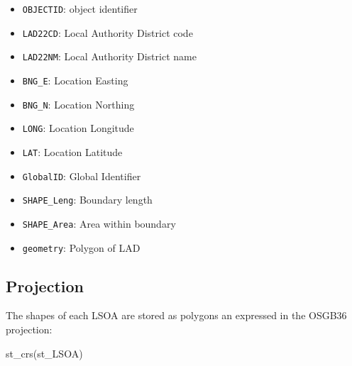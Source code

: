 \documentclass[
  letterpaper,
  DIV=11,
  numbers=noendperiod]{scrreprt}
\newenvironment{Shaded}{\begin{snugshade}}{\end{snugshade}}
\newcommand{\FunctionTok}[1]{\textcolor[rgb]{0.28,0.35,0.67}{#1}}
\newcommand{\NormalTok}[1]{\textcolor[rgb]{0.00,0.23,0.31}{#1}}
\providecommand{\tightlist}{%
  \setlength{\itemsep}{0pt}\setlength{\parskip}{0pt}}\usepackage{longtable,booktabs,array}
\begin{document}
\begin{itemize}
\tightlist
\item
  \texttt{OBJECTID}: object identifier
\item
  \texttt{LAD22CD}: Local Authority District code
\item
  \texttt{LAD22NM}: Local Authority District name
\item
  \texttt{BNG\_E}: Location Easting
\item
  \texttt{BNG\_N}: Location Northing
\item
  \texttt{LONG}: Location Longitude
\item
  \texttt{LAT}: Location Latitude
\item
  \texttt{GlobalID}: Global Identifier
\item
  \texttt{SHAPE\_Leng}: Boundary length
\item
  \texttt{SHAPE\_Area}: Area within boundary
\item
  \texttt{geometry}: Polygon of LAD
\end{itemize}

\hypertarget{projection}{%
\subsection*{Projection}\label{projection}}

The shapes of each LSOA are stored as polygons an expressed in the
OSGB36 projection:

\begin{Shaded}
\begin{Highlighting}[]
\FunctionTok{st\_crs}\NormalTok{(st\_LSOA)}
\end{Highlighting}
\end{Shaded}
\end{document}
